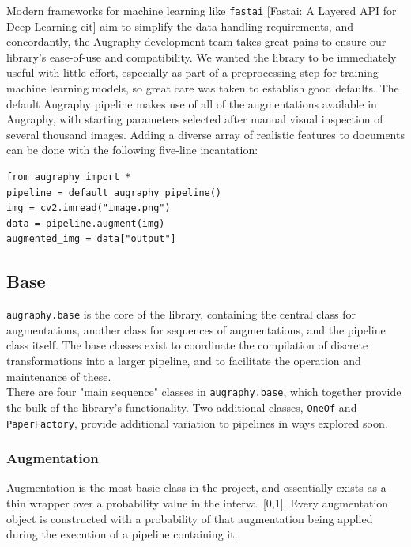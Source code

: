 \documentclass[runningheads]{article}
\begin{document}
Modern frameworks for machine learning like \texttt{fastai} [Fastai: A Layered API for Deep Learning cit] aim to simplify the data handling requirements, and concordantly, the Augraphy development team takes great pains to ensure our library's ease-of-use and compatibility. We wanted the library to be immediately useful with little effort, especially as part of a preprocessing step for training machine learning models, so great care was taken to establish good defaults. The default Augraphy pipeline makes use of all of the augmentations available in Augraphy, with starting parameters selected after manual visual inspection of several thousand images. Adding a diverse array of realistic features to documents can be done with the following five-line incantation:

\begin{verbatim}
from augraphy import *
pipeline = default_augraphy_pipeline()
img = cv2.imread("image.png")
data = pipeline.augment(img)
augmented_img = data["output"]
\end{verbatim}

\subsection{Base}
\label{sec:org1182db0}
\texttt{augraphy.base} is the core of the library, containing the central class for augmentations, another class for sequences of augmentations, and the pipeline class itself. The base classes exist to coordinate the compilation of discrete transformations into a larger pipeline, and to facilitate the operation and maintenance of these.\\

There are four "main sequence" classes in \texttt{augraphy.base}, which together provide the bulk of the library's functionality. Two additional classes, \texttt{OneOf} and \texttt{PaperFactory}, provide additional variation to pipelines in ways explored soon.

\subsubsection{Augmentation}
\label{sec:org73d5fe0}
Augmentation is the most basic class in the project, and essentially exists as a thin wrapper over a probability value in the interval [0,1]. Every augmentation object is constructed with a probability of that augmentation being applied during the execution of a pipeline containing it.\\
\end{document}

